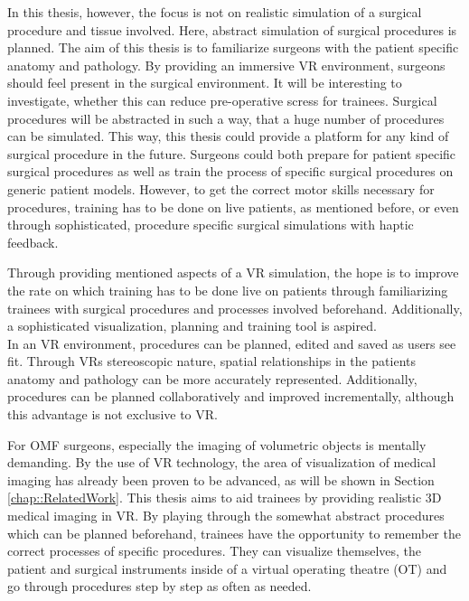 In this thesis, however, the focus is not on realistic simulation of a surgical procedure and tissue involved.
Here, abstract simulation of surgical procedures is planned.
The aim of this thesis is to familiarize surgeons with the patient specific anatomy and pathology.
By providing an immersive VR environment, surgeons should feel present in the surgical environment.
It will be interesting to investigate, whether this can reduce pre-operative scress for trainees.
Surgical procedures will be abstracted in such a way, that a huge number of procedures can be simulated.
This way, this thesis could provide a platform for any kind of surgical procedure in the future. 
Surgeons could both prepare for patient specific surgical procedures as well as train the process of specific surgical procedures on generic patient models.  
However, to get the correct motor skills necessary for procedures, training has to be done on live patients, as mentioned before, or even through sophisticated, procedure specific surgical 
simulations with haptic feedback.

Through providing mentioned aspects of a VR simulation, the hope is to improve the rate on which training has to be done live on patients through familiarizing trainees with 
surgical procedures and processes involved beforehand.
Additionally, a sophisticated visualization, planning and training tool is aspired.
\\ In an VR environment, procedures can be planned, edited and saved as users see fit.
Through VRs stereoscopic nature, spatial relationships in the patients anatomy and pathology can be more accurately represented.
Additionally, procedures can be planned collaboratively and improved incrementally, although this advantage is not exclusive to VR.

For OMF surgeons, especially the imaging of volumetric objects is mentally demanding. 
By the use of VR technology, the area of visualization of medical imaging has already been proven to be advanced, as will be shown in Section \ref{chap::RelatedWork}.
This thesis aims to aid trainees by providing realistic 3D medical imaging in VR.
By playing through the somewhat abstract procedures which can be planned beforehand, trainees have the opportunity to remember the correct processes of specific procedures.
They can visualize themselves, the patient and surgical instruments inside of a virtual operating theatre (OT) and go through procedures step by step as often as needed.